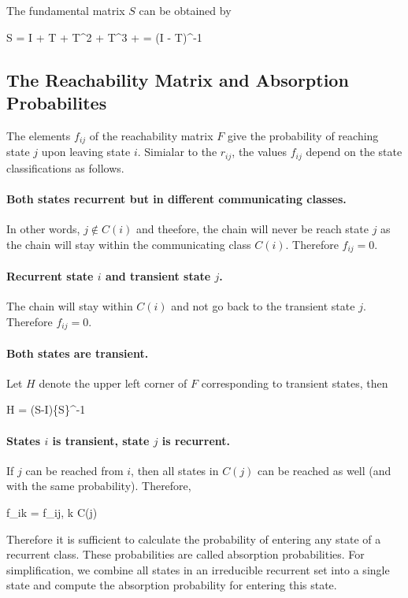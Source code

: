 The fundamental matrix $S$ can be obtained by

\bee
S = I + T + T^2 + T^3 + \cdots = (I - T)^{-1}
\eee


\subsection{The Reachability Matrix and Absorption Probabilites}

The elements $f_{ij}$ of the reachability matrix $F$ give the probability of reaching state $j$ upon leaving state $i$. Simialar to the $r_{ij}$, the values $f_{ij}$ depend on the state classifications as follows.

\paragraph{Both states recurrent but in different communicating classes.} In other words, $j \notin C(i)$ and theefore, the chain will never be reach state $j$ as the chain will stay within the communicating class $C(i)$. Therefore $f_{ij} = 0$.

\paragraph{Recurrent state $i$ and transient state $j$.} The chain will stay within $C(i)$ and not go back to the transient state $j$. Therefore $f_{ij} = 0$.

\paragraph{Both states are transient.} Let $H$ denote the upper left corner of $F$ corresponding to transient states, then

\bee
H = (S-I)\{S\}^{-1}
\eee


\paragraph{States $i$ is transient, state $j$ is recurrent.} If $j$ can be reached from $i$, then all states in $C(j)$ can be reached as well (and with the same probability). Therefore,

\bee
f_{ik} = f_{ij}, \quad \forall k \in C(j)
\eee

Therefore it is sufficient to calculate the probability of entering any state of a recurrent class. These probabilities are called absorption probabilities. For simplification, we combine all states in an irreducible recurrent set into a single state and compute the absorption probability for entering this state. 

